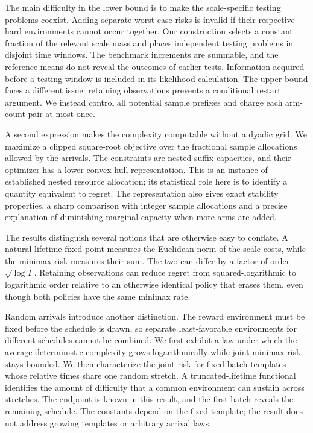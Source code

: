 The main difficulty in the lower bound is to make the scale-specific testing problems coexist. Adding separate worst-case risks is invalid if their respective hard environments cannot occur together. Our construction selects a constant fraction of the relevant scale mass and places independent testing problems in disjoint time windows. The benchmark increments are summable, and the reference means do not reveal the outcomes of earlier tests. Information acquired before a testing window is included in its likelihood calculation. The upper bound faces a different issue: retaining observations prevents a conditional restart argument. We instead control all potential sample prefixes and charge each arm-count pair at most once.

A second expression makes the complexity computable without a dyadic grid. We maximize a clipped square-root objective over the fractional sample allocations allowed by the arrivals. The constraints are nested suffix capacities, and their optimizer has a lower-convex-hull representation. This is an instance of established nested resource allocation; its statistical role here is to identify a quantity equivalent to regret. The representation also gives exact stability properties, a sharp comparison with integer sample allocations and a precise explanation of diminishing marginal capacity when more arms are added.

The results distinguish several notions that are otherwise easy to conflate. A natural lifetime fixed point measures the Euclidean norm of the scale costs, while the minimax risk measures their sum. The two can differ by a factor of order $\sqrt{\log T}$. Retaining observations can reduce regret from squared-logarithmic to logarithmic order relative to an otherwise identical policy that erases them, even though both policies have the same minimax rate.

Random arrivals introduce another distinction. The reward environment must be fixed before the schedule is drawn, so separate least-favorable environments for different schedules cannot be combined. We first exhibit a law under which the average deterministic complexity grows logarithmically while joint minimax risk stays bounded. We then characterize the joint risk for fixed batch templates whose relative times share one random stretch. A truncated-lifetime functional identifies the amount of difficulty that a common environment can sustain across stretches. The endpoint is known in this result, and the first batch reveals the remaining schedule. The constants depend on the fixed template; the result does not address growing templates or arbitrary arrival laws.


